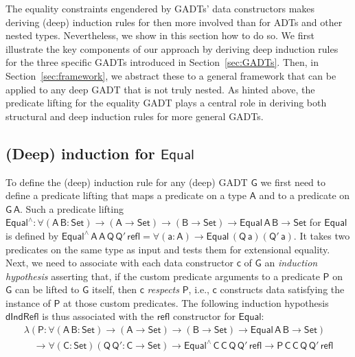 \documentclass[9pt]{entcs}
\begin{document}
The equality constraints engendered by GADTs' data constructors makes
deriving (deep) induction rules for then more involved than for ADTs
and other nested types. Nevertheless, we show in this section how to
do so. We first illustrate the key components of our approach by
deriving deep induction rules for the three specific GADTs introduced
in Section~\ref{sec:GADTs}. Then, in Section~\ref{sec:framework}, we
abstract these to a general framework that can be applied to any deep
GADT that is not truly nested. As hinted above, the predicate lifting
for the equality GADT plays a central role in deriving both structural
and deep induction rules for more general GADTs.
 
\subsection{(Deep) induction for $\mathsf{Equal}$}\label{sec:ind-equal}

To define the (deep) induction rule for any (deep) GADT $\mathsf{G}$
we first need to define a predicate lifting that maps a predicate on a
type $\mathsf{A}$ and to a predicate on $\mathsf{G\,A}$. Such a
predicate lifting $\mathsf{Equal^{\wedge} : \forall (A\,B : Set) \to
  (A \to Set) \to (B \to Set) \to Equal\,A\,B \to Set}$ for
$\mathsf{Equal}$ is defined by
$\mathsf{Equal^{\wedge}\,A\,A\,Q\,Q'\,refl = \forall (a : A) \to
  Equal\,(Q\,a)(Q'\,a)}$.  It takes two predicates on the same type as
input and tests them for extensional equality.
%
Next, we need to associate with each data constructor $\mathsf{c}$ of
$\mathsf{G}$ an {\em induction hypothesis} asserting that, if the
custom predicate arguments to a predicate $\mathsf{P}$ on $\mathsf{G}$
can be lifted to $\mathsf{G}$ itself, then $\mathsf{c}$ {\em respects}
$\mathsf{P}$, i.e., $\mathsf{c}$ constructs data satisfying the
instance of $\mathsf{P}$ at those custom predicates. The following
induction hypothesis $\mathsf{dIndRefl}$ is thus associated with the
$\mathsf{refl}$ constructor for $\mathsf{Equal}$:
\begin{equation*}\label{eq:ind-refl}
\begin{array}{l}
\mathsf{\lambda (P : \forall (A\,B : Set) \to (A \to Set) \to (B \to
  Set) \to Equal\,A\,B \to Set)} \\ 
\quad\mathsf{\to \forall (C : Set) (Q\, Q' : C \to Set) \to
  Equal^{\wedge}\,C\,C\,Q\,Q'\,refl \to P\,C\,C\,Q\,Q'\,refl} 
\end{array}
\end{equation*}
\end{document}
